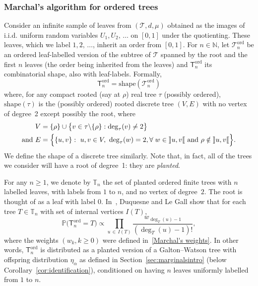 \documentclass[AHL,Unicode,longabstracts,published]{cedram}
\newcommand{\llbracketl}{\mathopen{]\mkern -2.7mu]}}
\newcommand{\rrbracketl}{\mathclose{[\mkern -2.7mu[}}
\newcommand{\ord}{\mathrm{ord}}
\newcommand{\shape}{\mathrm{shape}}
\newcommand{\cT}{\mathcal{T}}
\newcommand{\sT}{\mathsf{T}}
\newcommand{\A}{\mathbb{T}}
\newcommand{\N}{\mathbb{N}}
\newcommand{\bbP}{\mathbb{P}}
\let\oldforall\forall
\renewcommand*{\forall}{\mathrel{\oldforall}}
\begin{document}
\subsubsection{Marchal's algorithm for ordered trees}\label{sec:MarchalTree}

Consider an infinite sample of leaves from $(\cT,d,\mu)$ obtained as the images of i.i.d. uniform random variables $U_1, U_2,\,\ldots$ on $[0,1]$ under the quotienting. These leaves, which we label $1, 2, \,\ldots$, inherit an order from $[0,1]$. For $n \in \N$, let $\cT^{\ord}_n$ be an ordered leaf-labelled version of the subtree of $\cT$ spanned by the root and the first $n$ leaves (the order being inherited from the leaves) and $\sT^{\ord}_n$ its combinatorial shape, also with leaf-labels. Formally,
\[
\sT^{\ord}_n=\shape\left(\cT^{\ord}_n\right)
\]
where, for any compact rooted (say at $\rho$) real tree $\tau$ (possibly ordered), $\shape(\tau)$ is the (possibly ordered) rooted discrete tree $(V,E)$ with no vertex of degree~2 except possibly the root, where
\begin{equation}\label{def:shape}
\begin{split}
V &= \{\rho\} \cup \big\{v \in \tau\backslash \{\rho\}:\deg_{\tau}(v) \neq 2\big\} \\
\text{and} \ E &= \Big\{\{u,v\}:\ u,v\in V,\ \deg_{\tau}(w)=2, \forall w \in\llbracketl u,v\rrbracketl\text{ and } \rho \notin\llbracketl u,v\rrbracketl\Big\}.
\end{split}
\end{equation}
We define the shape of a discrete tree similarly. Note that, in fact, all of the trees we consider will have a root of degree~1: they are \emph{planted}.


For any $n\geq 1$, we denote by $\A_n$ the set of planted ordered finite trees with $n$ labelled leaves, with labels from $1$ to $n$, and no vertex of degree~$2$. The root is thought of as a leaf with label $0$. In~\cite[Section~3]{DuquesneLeGall}, Duquesne and Le Gall show that for each tree $T\in\A_n$ with set of internal vertices $I(T)$,
\begin{equation}\label{plane tree distribution}
\bbP\big(\sT^{\ord}_n=T\big)\propto \prod_{u\,\in\, I(T)}\frac{w_{\deg_T(u)-1}}{\left(\deg_T(u)-1\right)!},
\end{equation}
where the weights $(w_k,k\geq 0)$ were defined in~\eqref{Marchal's weights}. In other words, $\sT^{\ord}_n$ is distributed as a planted version of a Galton--Watson tree with offspring distribution $\eta_{\alpha}$ as defined in Section~\ref{sec:marginalsintro} (below Corollary~\ref{cor:identification}), conditioned on having $n$ leaves uniformly labelled from $1$ to $n$.
\end{document}
